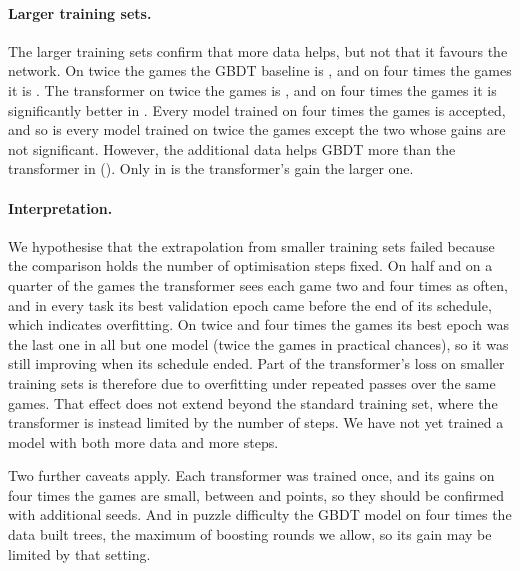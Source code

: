 \documentclass[11pt]{article}
\begin{document}
\paragraph{Larger training sets.}
The larger training sets confirm that more data helps, but not that it
favours the network. On twice the games the GBDT baseline is
, and on four times the games it is
. The transformer on twice the games is
, and on four times the
games it is significantly better in
. Every model
trained on four times the games is accepted, and so is every model trained
on twice the games except the two whose gains are not significant. However,
the additional data helps GBDT more than the transformer in
(). Only in
 is the transformer's gain
the larger one.

\paragraph{Interpretation.}
We hypothesise that the extrapolation from smaller training sets failed
because the comparison holds the number of optimisation steps fixed. On half
and on a quarter of the games the transformer sees each game two and four
times as often, and in every task its best validation epoch came before the
end of its schedule, which indicates overfitting. On twice and four times
the games its best epoch was the last one in all but one model (twice the
games in practical chances), so it was still improving when its schedule
ended. Part of the transformer's loss on
smaller training sets is therefore due to overfitting under repeated passes
over the same games. That effect does not extend beyond the standard
training set, where the transformer is instead limited by the number of
steps. We have not yet trained a model with both more data and more steps.

Two further caveats apply. Each transformer was trained once, and its gains
on four times the games are small, between
 and
 points, so they
should be confirmed with additional seeds. And in puzzle difficulty the GBDT
model on four times the data built
 trees, the maximum of
 boosting rounds we allow, so its gain may be limited
by that setting.
\end{document}
